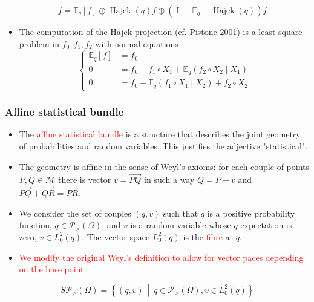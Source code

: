 \documentclass[xcolor=svgnames]{beamer}
\DeclareMathOperator{\Hajek}{Hajek}
\newcommand{\condexpat}[3]{\mathbb E_{#1}\left(#2 \middle| #3\right)}
\newcommand{\expectat}[2]{\mathbb E_{#1}\left[#2\right]}
\newcommand{\hajekof}[1]{\Hajek\left(#1\right)}
\newcommand{\model}{\mathcal M}
\newcommand{\opensimplexon}[1]{\mathcal P_>\left(#1\right)}
\newcommand{\rosso}[1]{\textcolor{red}{#1}}
\newcommand{\setof}[2]{\left\{#1 \, \middle| \, #2 \right\}}
\renewcommand{\emph}{\rosso}
\begin{document}
\begin{frame}
\begin{itemize}
\begin{equation*}
        f = \expectat q f \oplus \hajekof q f \oplus (\operatorname I  - 
 \mathbb E_q - \hajekof q) f \ .
    \end{equation*}
    \item The computation of the Hajek projection (cf. Pistone 2001) is a least square problem in $f_0,f_1,f_2$ with normal equations
\begin{equation*}  \left\{  \begin{aligned}
        \expectat q {f} &= f_0 \\
        0 &= f_0 + f_1\circ X_1 + \condexpat q {f_2 \circ X_2}{X_1} \\ 
        0 &= f_0 + \condexpat q {f_1 \circ X_1}{X_2} + f_2\circ X_2
        \end{aligned} \right.
      \end{equation*}
    \end{itemize}
\end{frame}

\begin{frame}\small\frametitle{Affine statistical bundle}
\begin{itemize}
    \item The \emph{affine statistical bundle} is a structure that describes the joint geometry of probabilities and random variables. This justifies the adjective "statistical".
\item The geometry is affine in the sense of Weyl's axioms: for each couple of points $P, Q \in \model$ there is vector $v = \overrightarrow{PQ}$ in such a way $Q = P+v$ and $\overrightarrow{PQ}+\overrightarrow{QR}=\overrightarrow{PR}$. 

\item We consider the set of couples $(q,v)$ such that $q$ is a positive probability function, $q \in \opensimplexon \Omega$, and $v$ is a random variable whose $q$-expectation is zero, $v \in L^2_0(q)$. The vector space $L_0^2(q)$ is the \emph{fibre} at $q$.

\item \emph{We modify the original Weyl's definition to allow for vector paces depending on the base point.}
\end{itemize} 

\begin{definition}
    \begin{equation*}
        S\opensimplexon \Omega = \setof{(q,v)}{q \in \opensimplexon \Omega, v \in L^2_0(q)}
    \end{equation*}
\end{definition}
\end{frame}
\end{document}
